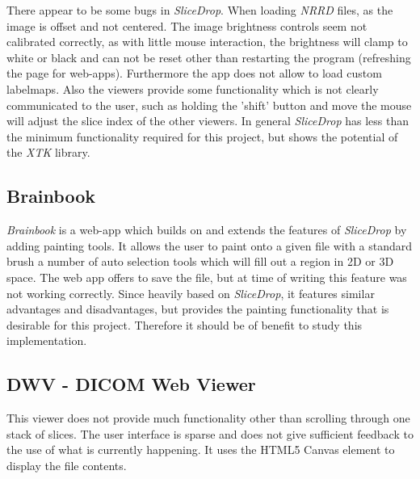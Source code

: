 \documentclass[a4paper,11pt,titlepage]{article}
\begin{document}
There appear to be some bugs in \textit{SliceDrop}. When loading \textit{NRRD} files, as the image is offset and not centered. The image brightness controls seem not calibrated correctly, as with little mouse interaction, the brightness will clamp to white or black and can not be reset other than restarting the program (refreshing the page for web-apps). Furthermore the app does not allow to load custom labelmaps. Also the viewers provide some functionality which is not clearly communicated to the user, such as holding the 'shift' button and move the mouse will adjust the slice index of the other viewers. In general \textit{SliceDrop} has less than the minimum functionality required for this project, but shows the potential of the \textit{XTK} library. 


\subsection{Brainbook}
\textit{Brainbook}\cite{brainbook} is a web-app which builds on and extends the features of \textit{SliceDrop} by adding painting tools. It allows the user to paint onto a given file with a standard brush a number of auto selection tools which will fill out a region in 2D or 3D space. The web app offers to save the file, but at time of writing this feature was not working correctly. Since heavily based on \textit{SliceDrop}, it features similar advantages and disadvantages, but provides the painting functionality that is desirable for this project. Therefore it should be of benefit to study this implementation.

\subsection{DWV - DICOM Web Viewer}
This viewer does not provide much functionality other than scrolling through one stack of slices. The user interface is sparse and does not give sufficient feedback to the use of what is currently happening. It uses the HTML5 Canvas element to display the file contents.
\end{document}
